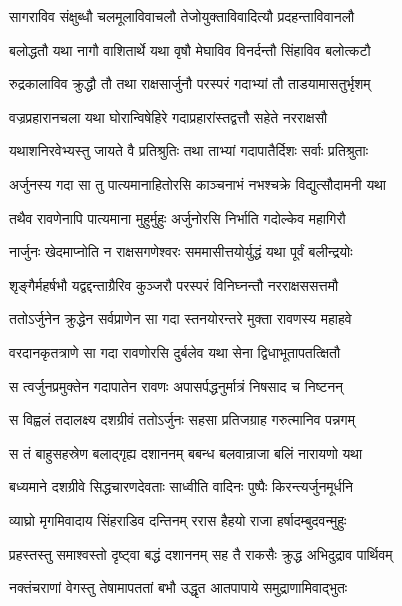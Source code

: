 \twolineshloka
{सागराविव संक्षुब्धौ चलमूलाविवाचलौ}
{तेजोयुक्ताविवादित्यौ प्रदहन्ताविवानलौ} %

\twolineshloka
{बलोद्धतौ यथा नागौ वाशितार्थे यथा वृषौ}
{मेघाविव विनर्दन्तौ सिंहाविव बलोत्कटौ} %

\twolineshloka
{रुद्रकालाविव क्रुद्धौ तौ तथा राक्षसार्जुनौ}
{परस्परं गदाभ्यां तौ ताडयामासतुर्भृशम्} %

\twolineshloka
{वज्रप्रहारानचला यथा घोरान्विषेहिरे}
{गदाप्रहारांस्तद्वत्तौ सहेते नरराक्षसौ} %

\twolineshloka
{यथाशनिरवेभ्यस्तु जायते वै प्रतिश्रुतिः}
{तथा ताभ्यां गदापातैर्दिशः सर्वाः प्रतिश्रुताः} %

\twolineshloka
{अर्जुनस्य गदा सा तु पात्यमानाहितोरसि}
{काञ्चनाभं नभश्चक्रे विद्युत्सौदामनी यथा} %

\twolineshloka
{तथैव रावणेनापि पात्यमाना मुहुर्मुहुः}
{अर्जुनोरसि निर्भाति गदोल्केव महागिरौ} %

\twolineshloka
{नार्जुनः खेदमाप्नोति न राक्षसगणेश्वरः}
{सममासीत्तयोर्युद्धं यथा पूर्वं बलीन्द्रयोः} %

\twolineshloka
{शृङ्गैर्महर्षभौ यद्वद्दन्ताग्रैरिव कुञ्जरौ}
{परस्परं विनिघ्नन्तौ नरराक्षससत्तमौ} %

\twolineshloka
{ततोऽर्जुनेन क्रुद्धेन सर्वप्राणेन सा गदा}
{स्तनयोरन्तरे मुक्ता रावणस्य महाहवे} %

\twolineshloka
{वरदानकृतत्राणे सा गदा रावणोरसि}
{दुर्बलेव यथा सेना द्विधाभूतापतत्क्षितौ} %

\twolineshloka
{स त्वर्जुनप्रमुक्तेन गदापातेन रावणः}
{अपासर्पद्धनुर्मात्रं निषसाद च निष्टनन्} %

\twolineshloka
{स विह्वलं तदालक्ष्य दशग्रीवं ततोऽर्जुनः}
{सहसा प्रतिजग्राह गरुत्मानिव पन्नगम्} %

\twolineshloka
{स तं बाहुसहस्रेण बलाद्गृह्य दशाननम्}
{बबन्ध बलवान्राजा बलिं नारायणो यथा} %

\twolineshloka
{बध्यमाने दशग्रीवे सिद्धचारणदेवताः}
{साध्वीति वादिनः पुष्पैः किरन्त्यर्जुनमूर्धनि} %

\twolineshloka
{व्याघ्रो मृगमिवादाय सिंहराडिव दन्तिनम्}
{ररास हैहयो राजा हर्षादम्बुदवन्मुहुः} %

\twolineshloka
{प्रहस्तस्तु समाश्वस्तो दृष्ट्वा बद्धं दशाननम्}
{सह तै राकसैः क्रुद्ध अभिदुद्राव पार्थिवम्} %

\twolineshloka
{नक्तंचराणां वेगस्तु तेषामापततां बभौ}
{उद्धृत आतपापाये समुद्राणामिवाद्भुतः} %

